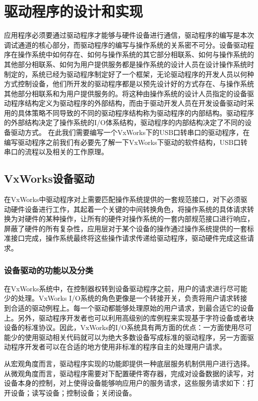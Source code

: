 \chapter{驱动程序的设计和实现}
	应用程序必须要通过驱动程序才能够与硬件设备进行通信，驱动程序的编写是本次调试通道的核心部分，而驱动程序的编写与操作系统的关系密不可分。设备驱动程序在操作系统中如何存在、如何与操作系统的其它部分相联系、如何与操作系统的其他部分相联系、如何为用户提供服务都是操作系统的设计人员在设计操作系统时制定的，系统已经为驱动程序制定好了一个框架，无论驱动程序的开发人员以何种方式控制设备，他们所开发的驱动程序都是以预先设计好的方式存在、与操作系统其他部分相联系和为用户提供服务的\cite{徐媛媛2003嵌入式实时操作系统的设备驱动}。将这种由操作系统的设计人员指定的设备驱动程序结构定义为驱动程序的外部结构，而由于驱动开发人员在开发设备驱动时采用的具体策略不同导致的不同的驱动程序结构称为驱动程序的内部结构。驱动程序的外部结构决定了操作系统的I/O体系结构，驱动程序的内部结构决定了不同的设备驱动方式。
	在此我们需要编写一个VxWorks下的USB口转串口的驱动程序，在编写驱动程序之前我们有必要先了解一下VxWorks下驱动的软件结构，USB口转串口的流程以及相关的工作原理。
\section{VxWorks设备驱动}
	在VxWorks中驱动程序对上需要匹配操作系统提供的一套规范接口，对下必须驱动硬件设备进行工作，其起着一个关键的中间转换角色，将操作系统的具体请求转换为对硬件的某种操作，让所有的硬件对操作系统的一套内部规范接口进行响应，屏蔽了硬件的所有复杂性，应用层对于某个设备的操作通过操作系统提供的一套标准接口完成，操作系统最终将这些操作请求传递给驱动程序，驱动硬件完成这些请求。	

\subsection{设备驱动的功能以及分类}
	在VxWorks系统中，在控制器权转到设备驱动程序之前，用户的请求进行尽可能少的处理。VxWorks I/O系统的角色更像是一个转接开关，负责将用户请求转接到合适的驱动例程上。每一个驱动都能够处理原始的用户请求，到最合适它的设备上。另外，驱动程序开发者也可以利用高级别的库例程来实现基于字符设备或者块设备的标准协议。因此，VxWorks的I/O系统具有两方面的优点：一方面使用尽可能少的使用驱动相关代码就可以为绝大多数设备写成标准的驱动程序，另一方面驱动程序开发者可以在合适的地方使用非标准的程序自主的处理用户请求。	
	
	从宏观角度而言，驱动程序实现的功能即提供一种底层服务机制供用户进行选择。从微观角度而言，驱动程序需要对下配置硬件寄存器，完成对设备数据的读写，对设备本身的控制，对上使得设备能够响应用户的服务请求，这些服务请求如下：打开设备；读写设备；控制设备；关闭设备。

